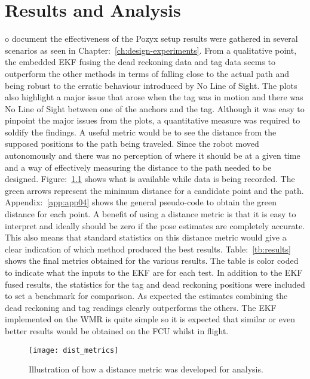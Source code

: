 \chapter{Results and Analysis}\label{ch:results-and-analysis}
o document the effectiveness of the Pozyx setup results were gathered in several scenarios as seen in Chapter:~\ref{ch:design-experiments}.
From a qualitative point, the embedded EKF fusing the dead reckoning data and tag data seems to outperform the other methods in terms of falling close to the actual path and being robust to the erratic behaviour introduced by No Line of Sight.
The plots also highlight a major issue that arose when the tag was in motion and there was No Line of Sight between one of the anchors and the tag.
Although it was easy to pinpoint the major issues from the plots, a quantitative measure was required to soldify the findings.
A useful metric would be to see the distance from the supposed positions to the path being traveled.
Since the robot moved autonomously and there was no perception of where it should be at a given time and a way of effectively measuring the distance to the path needed to be designed.
Figure:~\ref{fig:dist} shows what is available while data is being recorded.
The green arrows represent the minimum distance for a candidate point and the path.
Appendix:~\ref{app:app04} shows the general pseudo-code to obtain the green distance for each point.
A benefit of using a distance metric is that it is easy to interpret and ideally should be zero if the pose estimates are completely accurate.
This also means that standard statistics on this distance metric would give a clear indication of which method produced the best results.
Table:~\ref{tb:results} shows the final metrics obtained for the various results.
The table is color coded to indicate what the inputs to the EKF are for each test.
In addition to the EKF fused results, the statistics for the tag and dead reckoning positions were included to set a benchmark for comparison.
As expected the estimates combining the dead reckoning and tag readings clearly outperforms the others.
The EKF implemented on the WMR is quite simple so it is expected that similar or even better results would be obtained on the FCU whilst in flight.

\begin{figure}[h!]
    \centering
    \texttt{[image: dist\_metrics]}
    \caption{Illustration of how a distance metric was developed for analysis.}
    \label{fig:dist}
\end{figure}


